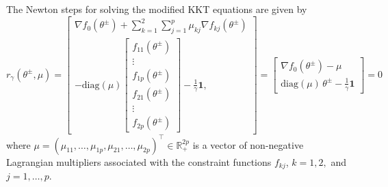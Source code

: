 \documentclass[11pt]{article}
\begin{document}
The Newton steps for solving the modified KKT equations are given by 
\[r_\gamma(\theta^{\pm}, \mu) = \begin{bmatrix}
\nabla f_0(\theta^{\pm}) + \sum_{k = 1}^2 \sum_{j = 1}^{p} \mu_{kj}  \nabla f_{kj}(\theta^{\pm})\\
-\text{diag}(\mu) \begin{bmatrix}
  f_{11}(\theta^{\pm}) \\
  \vdots \\
  f_{1p}(\theta^{\pm}) \\
  f_{21}(\theta^{\pm}) \\
  \vdots \\
  f_{2p}(\theta^{\pm})
\end{bmatrix}
- \frac{1}{\gamma}\mathbf{1},
\end{bmatrix} = \begin{bmatrix}
\nabla f_0(\theta^{\pm}) - \mu\\
\text{diag}(\mu) \, \theta^{\pm}
- \frac{1}{\gamma}\mathbf{1}
\end{bmatrix} = 0\]
where $\mu = (\mu_{11}, \ldots, \mu_{1p}, \mu_{21}, \ldots, \mu_{2p})^{\top} \in \mathbb{R}_+^{2p}$ is a vector of non-negative Lagrangian multipliers associated with the constraint functions $f_{kj}$, $k=1,2,$ and $j=1,\ldots,p$. 
\end{document}
